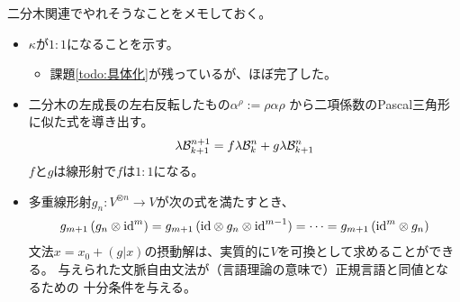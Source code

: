 {	\begin{todo}[考えること]\label{todo:考えること} %
		二分木関連でやれそうなことをメモしておく。
		\begin{itemize}\setlength{\itemsep}{-1mm} %
			\item $\kappa$が$1:1$になることを示す。
			\begin{itemize}\setlength{\itemsep}{-1mm} %
				\item 課題\ref{todo:具体化}が残っているが、ほぼ完了した。
			\end{itemize} %
			\item 二分木の左成長の左右反転したもの$\alpha^\rho:=\rho\alpha\rho$
			から二項係数のPascal三角形に似た式を導き出す。
			\begin{equation*}\begin{split}
				\lambda{\mathcal{B}}^{n+1}_{k+1} = f\lambda{\mathcal{B}}^n_k + g\lambda{\mathcal{B}}^n_{k+1}
			\end{split}\end{equation*}
			$f$と$g$は線形射で$f$は$1:1$になる。
			\item 多重線形射$g_n:V^{\otimes n}\to V$が次の式を満たすとき、
			\begin{equation*}\begin{split}
				g_{m+1}\mathinner{({g_n\otimes\mathinner{\operatorname{id}}^m})}
				= g_{m+1}\mathinner{({\mathinner{\operatorname{id}}\otimes g_n\otimes\mathinner{\operatorname{id}}^{m-1}})}
				=\cdots
				= g_{m+1}\mathinner{({\mathinner{\operatorname{id}}^m\otimes g_n})}
			\end{split}\end{equation*}
			文法$x=x_0+(g|x)$の摂動解は、実質的に$V$を可換として求めることができる。
			与えられた文脈自由文法が（言語理論の意味で）正規言語と同値となるための
			十分条件を与える。
		\end{itemize} %
	\end{todo} %
%
}\endgroup %
